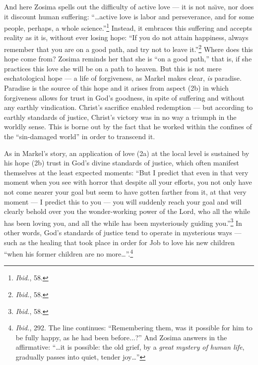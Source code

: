 And here Zosima spells out the difficulty of active love --- it is not na\"{\i}ve, nor does it discount human suffering: ``\ldots active love is labor and perseverance, and for some people, perhaps, a whole science.''\footnote{\emph{Ibid.}, 58.} Instead, it embraces this suffering and accepts reality as it is, without ever losing hope: ``If you do not attain happiness, always remember that you are on a good path, and try not to leave it.''\footnote{\emph{Ibid.}, 58.} Where does this hope come from? Zosima reminds her that she is ``on a good path,'' that is, if she practices this love she will be on a path to heaven. But this is not mere eschatological hope --- a life of forgiveness, as Markel makes clear, \emph{is} paradise. Paradise is the source of this hope and it arises from aspect (2b) in which forgiveness allows for trust in God's goodness, in spite of suffering and without any earthly vindication. Christ's sacrifice enabled redemption --- but according to earthly standards of justice, Christ's victory was in no way a triumph in the worldly sense. This is borne out by the fact that he worked within the confines of the ``sin-damaged world'' in order to transcend it. 

As in Markel's story, an application of love (2a) at the local level is sustained by his hope (2b) trust in God's divine standards of justice, which often manifest themselves at the least expected moments: ``But I predict that even in that very moment when you see with horror that despite all your efforts, you not only have not come nearer your goal but seem to have gotten farther from it, at that very moment --- I predict this to you --- you will suddenly reach your goal and will clearly behold over you the wonder-working power of the Lord, who all the while has been loving you, and all the while has been mysteriously guiding you.''\footnote{\emph{Ibid.}, 58.} In other words, God's standards of justice tend to operate in mysterious ways --- such as the healing that took place in order for Job to love his new children ``when his former children are no more\ldots''.\footnote{\emph{Ibid.}, 292. The line continues: ``Remembering them, was it possible for him to be fully happy, as he had been before...?'' And Zosima answers in the affirmative: ``\ldots it is possible: the old grief, by a \emph{great mystery of human life}, gradually passes into quiet, tender joy\ldots''}

